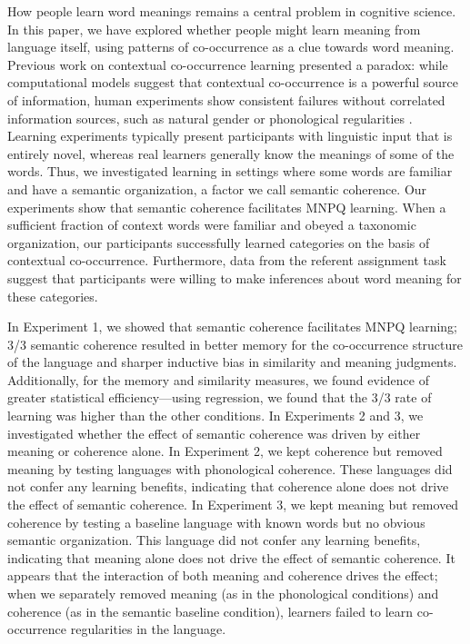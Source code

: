 \documentclass[man,floatsintext]{apa6}
\begin{document}
How people learn word meanings remains a central problem in cognitive science. In this paper, we have explored whether people might learn meaning from language itself, using patterns of co-occurrence as a clue towards word meaning. Previous work on contextual co-occurrence learning presented a paradox: while computational models suggest that contextual co-occurrence is a powerful source of information, human experiments show consistent failures without correlated information sources, such as natural gender \citep{braine1987} or phonological regularities \citep{frigo1998, monaghan2005, lany2010}. Learning experiments typically present participants with linguistic input that is entirely novel, whereas real learners generally know the meanings of some of the words. Thus, we investigated learning in settings where some words are familiar and have a semantic organization, a factor we call semantic coherence. Our experiments show that semantic coherence facilitates MNPQ learning. When a sufficient fraction of context words were familiar and obeyed a taxonomic organization, our participants successfully learned categories on the basis of contextual co-occurrence. Furthermore, data from the referent assignment task suggest that participants were willing to make inferences about word meaning for these categories.

In Experiment 1, we showed that semantic coherence facilitates MNPQ learning; 3/3 semantic coherence resulted in better memory for the co-occurrence structure of the language and sharper inductive bias in similarity and meaning judgments. Additionally, for the memory and similarity measures, we found evidence of greater statistical efficiency---using regression, we found that the 3/3 rate of learning was higher than the other conditions. In Experiments 2 and 3, we investigated whether the effect of semantic coherence was driven by either meaning or coherence alone. In Experiment 2, we kept coherence but removed meaning by testing languages with phonological coherence. These languages did not confer any learning benefits, indicating that coherence alone does not drive the effect of semantic coherence. In Experiment 3, we kept meaning but removed coherence by testing a baseline language with known words but no obvious semantic organization. This language did not confer any learning benefits, indicating that meaning alone does not drive the effect of semantic coherence. It appears that the interaction of both meaning and coherence drives the effect; when we separately removed meaning (as in the phonological conditions) and coherence (as in the semantic baseline condition), learners failed to learn co-occurrence regularities in the language.
\end{document}

